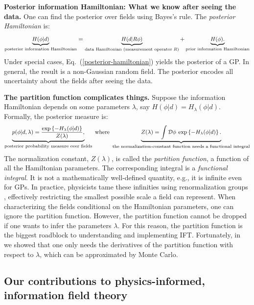 \textbf{Posterior information Hamiltonian: What we know after seeing the data.}
One can find the posterior over fields using Bayes's rule. The \emph{posterior Hamiltonian} is:
\begin{equation}
\small
\label{posterior-hamiltonian}
\underbrace{H(\phi|d)}_{\text{posterior information Hamiltonian}} 
= \underbrace{H(d|R\phi)}_{\text{data Hamiltonian (measurement operator}\;R)} 
+ 
\underbrace{H(\phi).}_{\text{prior information Hamiltonian}}
\end{equation}
Under special cases, Eq.~(\ref{posterior-hamiltonian}) yields the posterior of a GP.
In general, the result is a non-Gaussian random field.
The posterior encodes all uncertainty about the fields after seeing the data.

\textbf{The partition function complicates things.}
Suppose the information Hamiltonian depends on some parameters $\lambda$, say $H(\phi|d) = H_\lambda(\phi|d)$.
Formally, the posterior measure is:
\[
\small
\underbrace{p(\phi|d,\lambda) = \frac{\exp\left\{-H_\lambda(\phi|d)\right\}}{Z(\lambda)},}_{\text{posterior probability measure over fields}}
\;\text{where}\;
\underbrace{Z(\lambda) = \int \mathcal{D}\phi\: \exp\left\{-H_\lambda(\phi|d)\right\}.}_{\text{the normalization-constant function needs a functional integral}}
\]
The normalization constant, $Z(\lambda)$, is called the \emph{partition function}, a function of all the Hamiltonian parameters.
The corresponding integral is a \emph{functional integral}.
It is not a mathematically well-defined quantity, e.g., it is infinite even for GPs.
In practice, physicists tame these infinities using renormalization groups \cite{lancaster2014quantum}, effectively restricting the smallest possible scale a field can represent.
When characterizing the fields conditional on the Hamiltonian parameters, one can ignore the partition function.
However, the partition function cannot be dropped if one wants to infer the parameters $\lambda$.
For this reason, the partition function is the biggest roadblock to understanding and implementing IFT.
Fortunately, in~\cite{alberts2023physics} we showed that one only needs the derivatives of the partition function with respect to $\lambda$, which can be approximated by Monte Carlo.


\subsection{Our contributions to physics-informed, information field theory}

